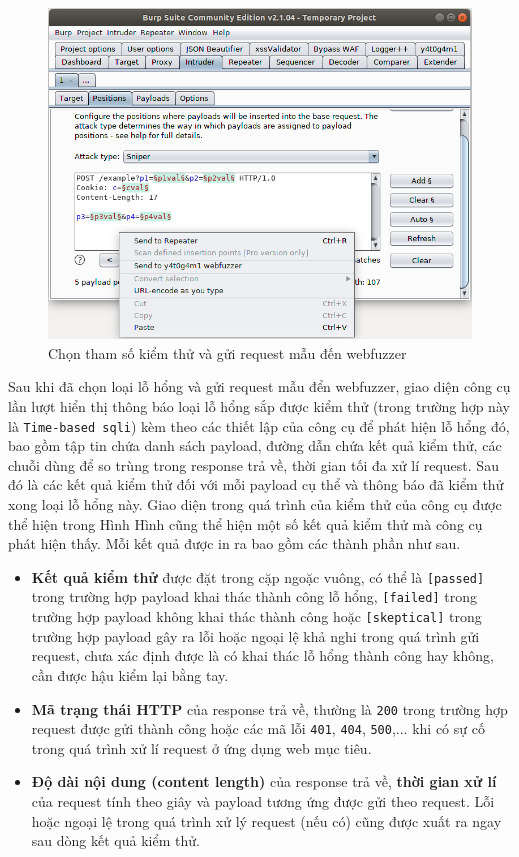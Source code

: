 \begin{figure}[H]
  \centering
    \includegraphics[width=\textwidth,keepaspectratio=true]{images/send-base-request.png}
  \caption{Chọn tham số kiểm thử và gửi request mẫu đến webfuzzer}
  \label{fig:send-base-request-1}
\end{figure}
Sau khi đã chọn loại lỗ hổng và gửi request mẫu đển webfuzzer, giao diện công cụ lần lượt hiển thị thông báo loại lỗ hổng sắp được kiểm thử (trong trường hợp này là \texttt{Time-based \acrshort{sqli}}) kèm theo các thiết lập của công cụ để phát hiện lỗ hổng đó, bao gồm tập tin chứa danh sách payload, đường dẫn chứa kết quả kiểm thử, các chuỗi dùng để so trùng trong response trả về, thời gian tối đa xử lí request. Sau đó là các kết quả kiểm thử đối với mỗi payload cụ thể và thông báo đã kiểm thử xong loại lỗ hổng này. Giao diện trong quá trình của kiểm thử của công cụ được thể hiện trong Hình 
Hình cũng thể hiện một số kết quả kiểm thử mà công cụ phát hiện thấy. Mỗi kết quả được in ra bao gồm các thành phần như sau.
\begin{itemize}
    \item \textbf{Kết quả kiểm thử} được đặt trong cặp ngoặc vuông, có thể là \texttt{[passed]} trong trường hợp payload khai thác thành công lỗ hổng, \texttt{[failed]} trong trường hợp payload không khai thác thành công hoặc \texttt{[skeptical]} trong trường hợp payload gây ra lỗi hoặc ngoại lệ khả nghi trong quá trình gửi request, chưa xác định được là có khai thác lỗ hổng thành công hay không, cần được hậu kiểm lại bằng tay.
    \item \textbf{Mã trạng thái HTTP} của response trả về, thường là \texttt{200} trong trường hợp request được gửi thành công hoặc các mã lỗi \texttt{401}, \texttt{404}, \texttt{500},... khi có sự cố trong quá trình xử lí request ở ứng dụng web mục tiêu.
    \item \textbf{Độ dài nội dung (content length)} của response trả về, \textbf{thời gian xử lí} của request tính theo giây và payload tương ứng được gửi theo request. Lỗi hoặc ngoại lệ trong quá trình xử lý request (nếu có) cũng được xuất ra ngay sau dòng kết quả kiểm thử.
\end{itemize}
